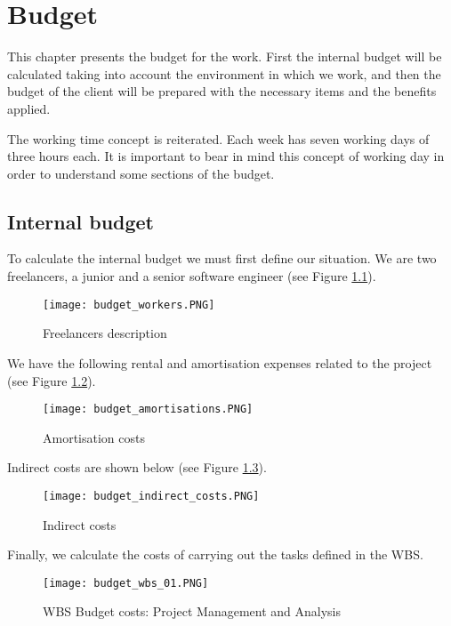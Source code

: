 \renewcommand{\documentname}{Budget}

\chapter{Budget} \label{section-budget}

This chapter presents the budget for the work. First the internal budget will be calculated taking into account the environment in which we work, and then the budget of the client will be prepared with the necessary items and the benefits applied.

The working time concept is reiterated. Each week has seven working days of three hours each. It is important to bear in mind this concept of working day in order to understand some sections of the budget.

\section{Internal budget}

To calculate the internal budget we must first define our situation. We are two freelancers, a junior and a senior software engineer (see Figure \ref{fig-budget-workers}).


\begin{figure}[H]
    \caption{Freelancers description}
    \label{fig-budget-workers}
  \centering
  \texttt{[image: budget\_workers.PNG]}
\end{figure}

We have the following rental and amortisation expenses related to the project (see Figure \ref{fig-budget-amortisations}).


\begin{figure}[H]
    \caption{Amortisation costs}
    \label{fig-budget-amortisations}
  \centering
  \texttt{[image: budget\_amortisations.PNG]}
\end{figure}

Indirect costs are shown below (see Figure \ref{fig-budget-ic}).


\begin{figure}[H]
    \caption{Indirect costs}
    \label{fig-budget-ic}
  \centering
  \texttt{[image: budget\_indirect\_costs.PNG]}
\end{figure}

Finally, we calculate the costs of carrying out the tasks defined in the WBS.


\begin{figure}[H]
    \caption{WBS Budget costs: Project Management and Analysis}
    \label{fig-budget-wbs-01}
  \centering
  \texttt{[image: budget\_wbs\_01.PNG]}
\end{figure}


